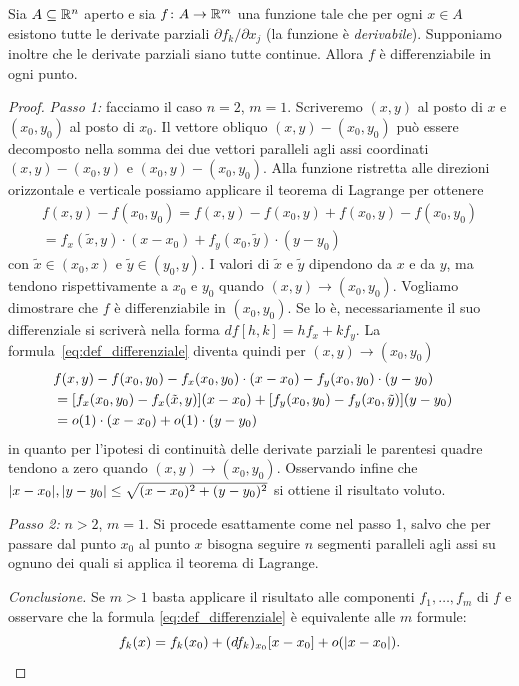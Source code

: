 \begin{theorem}
Sia $A\subseteq {\mathbb R}^n$ aperto 
e sia $ f\colon A \to {\mathbb R}^m$ una funzione 
tale che per ogni $ x\in A$ esistono 
tutte le derivate parziali $\partial f_k/\partial x_j$
(la funzione è \emph{derivabile}).
Supponiamo inoltre che le derivate parziali siano 
tutte continue.
Allora $ f$ è differenziabile in ogni punto. 
\end{theorem}
\begin{proof}
\emph{Passo 1:} facciamo il caso $n=2$, $m=1$.
Scriveremo $(x,y)$ al posto di $ x$ 
e $(x_0,y_0)$ al posto di $ x_0$.
Il vettore obliquo $(x,y)-(x_0,y_0)$ 
può essere decomposto nella somma dei 
due vettori paralleli agli assi coordinati
$(x,y)-(x_0,y)$ e $(x_0,y)-(x_0,y_0)$.
Alla funzione ristretta 
alle direzioni orizzontale e verticale possiamo
applicare il teorema di Lagrange per ottenere
\begin{align*}
  f(x,y) - f(x_0,y_0)
  = f(x,y) - f(x_0,y) + f(x_0,y) - f(x_0,y_0) \\
  = f_x(\tilde x,y)\cdot (x-x_0)
    + f_y(x_0,\tilde y)\cdot (y-y_0)
\end{align*}
con $\tilde x \in (x_0,x)$ e $\tilde y\in(y_0,y)$.
I valori di $\tilde x$ e $\tilde y$ dipendono 
da $x$ e da $y$, ma tendono rispettivamente 
a $x_0$ e $y_0$ quando $(x,y)\to (x_0,y_0)$.
Vogliamo dimostrare che $f$ è differenziabile in $(x_0,y_0)$.
Se lo è, necessariamente il suo differenziale
si scriverà nella forma $df[h,k] = h f_x + k f_y$.
La formula~\eqref{eq:def_differenziale}
diventa quindi per $(x,y)\to(x_0,y_0)$
\begin{align*}
  \lefteqn{f(x,y) - f(x_0,y_0) 
  - f_x(x_0,y_0)\cdot (x-x_0) - f_y(x_0,y_0)\cdot (y-y_0)}\\
  &= \Enclose{f_x(x_0,y_0) - f_x(\tilde x, y)}(x-x_0)
   + \Enclose{f_y(x_0,y_0) - f_y(x_0,\tilde y)}(y-y_0)\\
  & = o(1) \cdot (x-x_0) + o(1) \cdot (y-y_0)
\end{align*}
in quanto per l'ipotesi di continuità delle derivate parziali
le parentesi quadre tendono a zero quando $(x,y)\to (x_0,y_0)$.
Osservando infine che 
${\left|x-x_0\right|}, {\left|y-y_0\right|}\le \sqrt{(x-x_0)^2 + (y-y_0)^2}$
si ottiene il risultato voluto.

\emph{Passo 2:} $n>2$, $m=1$.
Si procede esattamente come nel passo 1, salvo che per 
passare dal punto $ x_0$ al punto $ x$ bisogna 
seguire $n$ segmenti paralleli agli assi su ognuno 
dei quali si applica il teorema di Lagrange.

\emph{Conclusione.} Se $m>1$ basta applicare il risultato 
alle componenti $f_1,\dots, f_m$ di $ f$ e osservare 
che la formula \eqref{eq:def_differenziale} è equivalente 
alle $m$ formule:
\[
  f_k( x) = f_k( x_0) + (d f_k)_{ x_0}[ x- x_0] + o({\left| x- x_0\right|}).
\]
\end{proof}

